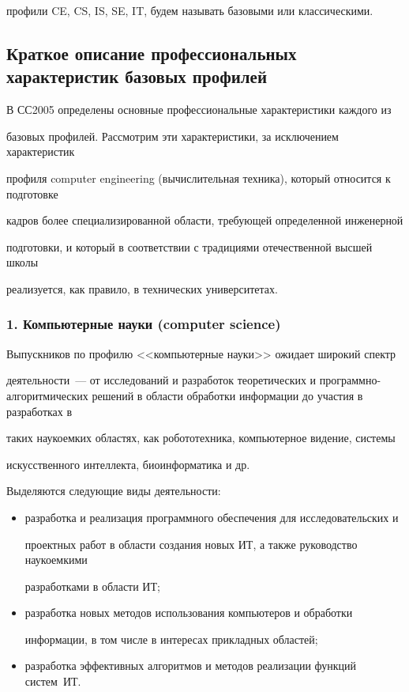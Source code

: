 профили CE, CS, IS, SE, IT, будем называть базовыми или классическими.



\subsection{Краткое описание профессиональных характеристик базовых профилей}

      

      В СС2005 определены основные профессиональные характеристики каждого из 

базовых профилей. Рассмотрим эти характеристики, за исключением характеристик 

профиля computer engineering (вычислительная техника), который относится к подготовке 

кадров более специализированной области, требующей определенной инженерной 

подготовки, и который в соответствии с традициями отечественной высшей школы 

реализуется, как правило, в технических университетах.



      \subsubsection*{1. Компьютерные науки (computer science)}

      

      Выпускников по профилю <<компьютерные науки>> ожидает широкий спектр 

деятельности~--- от исследований и разработок теоретических и про\-грам\-мно-ал\-го\-рит\-ми\-че\-ских решений в области обработки информации до участия в разработках в 

таких наукоемких областях, как робототехника, компьютерное видение, системы 

искусственного интеллекта, биоинформатика и др.

      

      Выделяются следующие виды деятельности:

      \begin{itemize}

\item разработка и реализация программного обеспечения для исследовательских и 

проектных работ в области создания новых ИТ, а также руководство наукоемкими 

разработками в области ИТ;

\item разработка новых методов использования компьютеров и обработки 

информации, в том числе в интересах прикладных областей;

\item разработка эффективных алгоритмов и методов реализации функций сис\-тем~ИТ.

\end{itemize}



